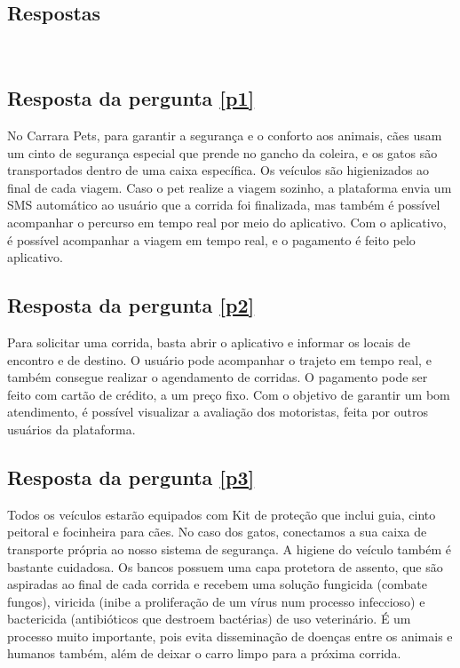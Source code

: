 \begin{apendicesenv}
\section{Respostas }\\
\subsection{Resposta da pergunta \ref{p1}}
No Carrara Pets, para garantir a segurança e o conforto aos animais, cães usam um cinto de segurança especial que prende no gancho da coleira, e os gatos são transportados dentro de uma caixa específica. Os veículos são higienizados ao final de cada viagem. Caso o pet realize a viagem sozinho, a plataforma envia um SMS automático ao usuário que a corrida foi finalizada, mas também é possível acompanhar o percurso em tempo real por meio do aplicativo. Com o aplicativo, é possível acompanhar a viagem em tempo real, e o pagamento é feito pelo aplicativo.

\subsection{Resposta da pergunta \ref{p2}}
Para solicitar uma corrida, basta abrir o aplicativo e informar os locais de encontro e de destino. O usuário pode acompanhar o trajeto em tempo real, e também consegue realizar o agendamento de corridas. O pagamento pode ser feito com cartão de crédito, a um preço fixo. Com o objetivo de garantir um bom atendimento, é possível visualizar a avaliação dos motoristas, feita por outros usuários da plataforma.

\subsection{Resposta da pergunta \ref{p3}}
Todos os veículos estarão equipados com Kit de proteção que inclui guia, cinto peitoral e focinheira para cães. No caso dos gatos, conectamos a sua caixa de transporte própria ao nosso sistema de segurança. A higiene do veículo também é bastante cuidadosa. Os bancos possuem uma capa protetora de assento, que são aspiradas ao final de cada corrida e recebem uma solução fungicida (combate fungos), viricida (inibe a proliferação de um vírus num processo infeccioso) e bactericida (antibióticos que destroem bactérias) de uso veterinário. É um processo muito importante, pois evita disseminação de doenças entre os animais e humanos também, além de deixar o carro limpo para a próxima corrida.


\end{apendicesenv}
